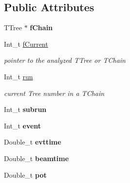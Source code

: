 \subsection*{Public Attributes}
\begin{DoxyCompactItemize}
\item 
\hypertarget{classanatree_af66156eb0d5e2f8c75c79968df2274c2}{T\-Tree $\ast$ {\bfseries f\-Chain}}\label{classanatree_af66156eb0d5e2f8c75c79968df2274c2}

\item 
\hypertarget{classanatree_af169b259e33ec8cac5f15528f1b665ac}{Int\-\_\-t \hyperlink{classanatree_af169b259e33ec8cac5f15528f1b665ac}{f\-Current}}\label{classanatree_af169b259e33ec8cac5f15528f1b665ac}

\begin{DoxyCompactList}\small\item\em pointer to the analyzed T\-Tree or T\-Chain \end{DoxyCompactList}\item 
\hypertarget{classanatree_a2276c94745faac374d25627c1f62b21a}{Int\-\_\-t \hyperlink{classanatree_a2276c94745faac374d25627c1f62b21a}{run}}\label{classanatree_a2276c94745faac374d25627c1f62b21a}

\begin{DoxyCompactList}\small\item\em current Tree number in a T\-Chain \end{DoxyCompactList}\item 
\hypertarget{classanatree_a547be48aea7822a67d3480a67b4020b1}{Int\-\_\-t {\bfseries subrun}}\label{classanatree_a547be48aea7822a67d3480a67b4020b1}

\item 
\hypertarget{classanatree_af0190b2eea3485d9c3c1d3f41e1ec23f}{Int\-\_\-t {\bfseries event}}\label{classanatree_af0190b2eea3485d9c3c1d3f41e1ec23f}

\item 
\hypertarget{classanatree_afb7cadab695f3519210673ba0b55777b}{Double\-\_\-t {\bfseries evttime}}\label{classanatree_afb7cadab695f3519210673ba0b55777b}

\item 
\hypertarget{classanatree_ada6a190fae7a7b06d5bebd0306831f0d}{Double\-\_\-t {\bfseries beamtime}}\label{classanatree_ada6a190fae7a7b06d5bebd0306831f0d}

\item 
\hypertarget{classanatree_a938fbc01abb82fb428125d22da9b4fb1}{Double\-\_\-t {\bfseries pot}}\label{classanatree_a938fbc01abb82fb428125d22da9b4fb1}


\end{DoxyCompactItemize}
